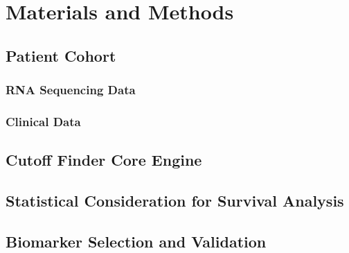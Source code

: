 \documentclass[
paper=landscape,
paper=160mm:90mm, %
fontsize=11pt, %
pagesize, %
parskip=half-, %
]{scrartcl} %
\theoremstyle{mythmstyle} %
\begin{document}
\begin{figure}
\begin{minipage}[c]{0.5\linewidth}

\end{minipage}
\end{figure}

\clearpage


\section{Materials and Methods} %


\subsection{Patient Cohort} 


\subsubsection{RNA Sequencing Data} 


\subsubsection{Clinical Data} 


\subsection{Cutoff Finder Core Engine}


\subsection{Statistical Consideration for Survival Analysis}


\subsection{Biomarker Selection and Validation}



\clearpage
\end{document}
